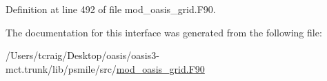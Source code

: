 Definition at line 492 of file mod\+\_\+oasis\+\_\+grid.\+F90.



The documentation for this interface was generated from the following file\+:\begin{DoxyCompactItemize}
\item 
/\+Users/tcraig/\+Desktop/oasis/oasis3-\/mct.\+trunk/lib/psmile/src/\hyperlink{mod__oasis__grid_8_f90}{mod\+\_\+oasis\+\_\+grid.\+F90}\end{DoxyCompactItemize}
